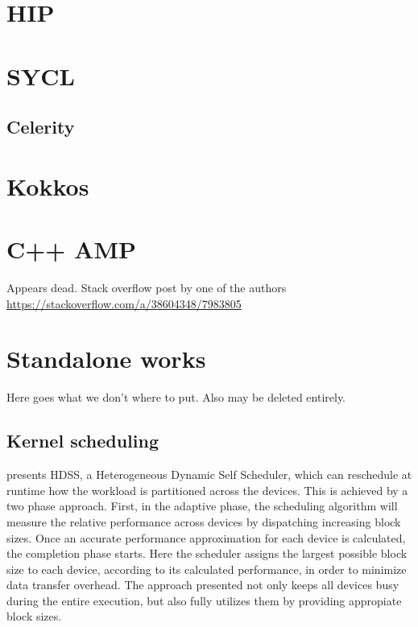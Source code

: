 \section{HIP}

\section{SYCL}
\subsection{Celerity}

\section{Kokkos}
\cite{kokkos}

\section{C++ AMP}
Appears dead. Stack overflow post by one of the authors \url{https://stackoverflow.com/a/38604348/7983805}


\section{Standalone works}

Here goes what we don't where to put. Also may be deleted entirely.

\subsection{Kernel scheduling}

\cite{dynamic_self_scheduling} presents HDSS, a Heterogeneous Dynamic Self Scheduler, which can reschedule at runtime how the workload is partitioned across the devices. This is achieved by a two phase approach. First, in the adaptive phase, the scheduling algorithm will measure the relative performance across devices by dispatching increasing block sizes. Once an accurate performance approximation for each device is calculated, the completion phase starts. Here the scheduler assigns the largest possible block size to each device, according to its calculated performance, in order to minimize data transfer overhead. The approach presented not only keeps all devices busy during the entire execution, but also fully utilizes them by providing appropiate block sizes. 
